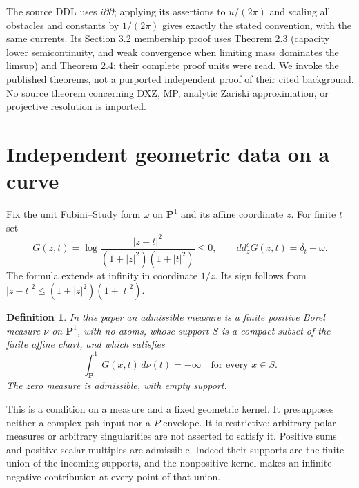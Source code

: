 \documentclass[11pt]{article}
\newtheorem{definition}[theorem]{Definition}
\theoremstyle{remark}\newtheorem{remark}[theorem]{Remark}
\newcommand{\ddc}{dd^c}
\newcommand{\PP}{\mathbf P^1}
\begin{document}
The source DDL uses $i\partial\bar\partial$; applying its assertions to
$u/(2\pi)$ and scaling all obstacles and constants by $1/(2\pi)$
gives exactly the stated convention, with the same currents.
Its Section 3.2 membership proof uses Theorem 2.3 (capacity lower
semicontinuity, and weak convergence when limiting mass dominates
the limsup) and Theorem 2.4; their complete proof units were read.
We invoke the published theorems, not a purported independent proof
of their cited background. No source theorem concerning DXZ, MP,
analytic Zariski approximation, or projective resolution is imported.

\section{Independent geometric data on a curve}
Fix the unit Fubini--Study form $\omega$ on $\PP$ and its affine
coordinate $z$. For finite $t$ set
\[
 G(z,t)=\log\frac{|z-t|^2}{(1+|z|^2)(1+|t|^2)}\leq0,\qquad
 \ddc_zG(z,t)=\delta_t-\omega.
 \tag{2.1}
\]
The formula extends at infinity in coordinate $1/z$. Its sign follows
from $|z-t|^2\leq(1+|z|^2)(1+|t|^2)$.

\begin{definition}
In this paper an admissible measure is a finite positive Borel measure
$\nu$ on $\PP$, with no atoms, whose support $S$ is a compact subset
of the finite affine chart, and which satisfies
\[
 \int_\PP G(x,t)\,d\nu(t)=-\infty\quad\text{for every }x\in S.
 \tag{2.2}
\]
The zero measure is admissible, with empty support.
\end{definition}
This is a condition on a measure and a fixed geometric kernel.
It presupposes neither a complex psh input nor a $P$-envelope.
It is restrictive: arbitrary polar measures or arbitrary singularities
are not asserted to satisfy it. Positive sums and positive scalar
multiples are admissible. Indeed their supports are the finite union
of the incoming supports, and the nonpositive kernel makes an infinite
negative contribution at every point of that union.
\end{document}

